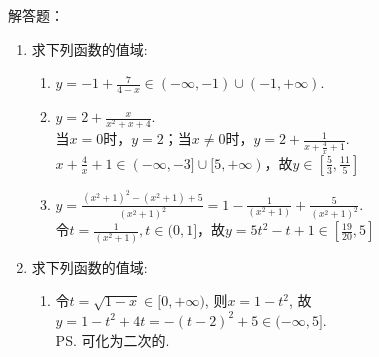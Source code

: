 \clearpage
解答题：
\begin{enumerate}
    \item 求下列函数的值域: \\
    \begin{jieda}
    \begin{enumerate}
    \item $y=-1+\frac{7}{4-x}\in(-\infty,-1)\cup(-1,+\infty)$. 
    
    \item $y=2+\frac{x}{x^2+x+4}$. \\
    当$x = 0$时，$y = 2$；当$x \neq 0$时，$y = 2 + \frac{1}{x + \frac{4}{x} + 1}$.\\
    $x + \frac{4}{x} + 1 \in (-\infty, -3]\cup [5, +\infty)$，故$y \in [\frac{5}{3}, \frac{11}{5}]$
    
    \item $y=\frac{(x^2+1)^2-(x^2+1)+5}{(x^2+1)^2}=1 - \frac{1}{(x^2+1)} + \frac{5}{(x^2+1)^2}$. \\
    令$t = \frac{1}{(x^2+1)}, t \in (0, 1]$，故$y = 5t^2-t+1 \in [\frac{19}{20}, 5]$
    \end{enumerate}
    \end{jieda}
    \begin{vspace_}
    \vsp[6]
    \end{vspace_}
    \item 求下列函数的值域: \\
    \begin{jieda}
    \begin{enumerate}
    \item 令$t=\sqrt{1-x}\in[0,+\infty)$, 则$x=1-t^2$, 故$y=1-t^2+4t=-(t-2)^2+5\in(-\infty,5]$. \\
    \ps 可化为二次的. 
    

\end{enumerate}
\end{jieda}
\end{enumerate}
